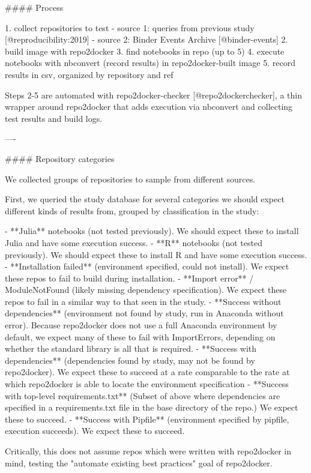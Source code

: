\documentclass{beamer}
\begin{document}
\begin{frame}[fragile]
\begin{columns}[T]
\begin{column}{.3\textwidth}
\begin{markdown}


#### Process

1. collect repositories to test
    - source 1: queries from previous study [@reproducibility:2019]
    - source 2: Binder Events Archive [@binder-events]
2. build image with repo2docker
3. find notebooks in repo (up to 5)
4. execute notebooks with nbconvert (record results) in repo2docker-built image
5. record results in csv, organized by repository and ref

Steps 2-5 are automated with repo2docker-checker [@repo2dockerchecker],
a thin wrapper around repo2docker that adds execution via nbconvert
and collecting test results and build logs.


----

#### Repository categories

We collected groups of repositories to sample from different sources.

First, we queried the study database for several categories we should expect different kinds of results from,
grouped by classification in the study:


- **Julia** notebooks (not tested previously). We should expect these to install Julia and have some execution success.
- **R** notebooks (not tested previously). We should expect these to install R and have some execution success.
- **Installation failed** (environment specified, could not install). We expect these repos to fail to build during installation.
- **Import error** / ModuleNotFound (likely missing dependency specification). We expect these repos to fail in a similar way to that seen in the study.
- **Success without dependencies** (environment not found by study, run in Anaconda without error). Because repo2docker does not use a full Anaconda environment by default, we expect many of these to fail with ImportErrors, depending on whether the standard library is all that is required.
- **Success with dependencies** (dependencies found by study, may not be found by repo2docker). We expect these to succeed at a rate comparable to the rate at which repo2docker is able to locate the environment specification
- **Success with top-level requirements.txt** (Subset of above where dependencies are specified in a requirements.txt file in the base directory of the repo.) We expect these to succeed.
- **Success with Pipfile** (environment specified by pipfile, execution succeeds). We expect these to succeed.

Critically, this does not assume repos which were written with repo2docker in mind,
testing the "automate existing best practices" goal of repo2docker.


\end{markdown}
\end{column}
\end{columns}
\end{frame}
\end{document}
